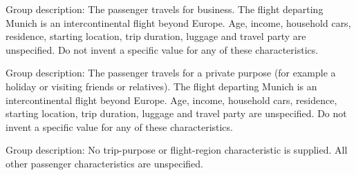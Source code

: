 \begin{promptbox}[title={business / intercontinental}]
Group description: The passenger travels for business. The flight departing Munich is an intercontinental flight beyond Europe. Age, income, household cars, residence, starting location, trip duration, luggage and travel party are unspecified. Do not invent a specific value for any of these characteristics.
\end{promptbox}


\begin{promptbox}[title={private / intercontinental}]
Group description: The passenger travels for a private purpose (for example a holiday or visiting friends or relatives). The flight departing Munich is an intercontinental flight beyond Europe. Age, income, household cars, residence, starting location, trip duration, luggage and travel party are unspecified. Do not invent a specific value for any of these characteristics.
\end{promptbox}


\begin{promptbox}[title={Exact Munich no-group replacement}]
Group description: No trip-purpose or flight-region characteristic is supplied. All other passenger characteristics are unspecified.
\end{promptbox}

